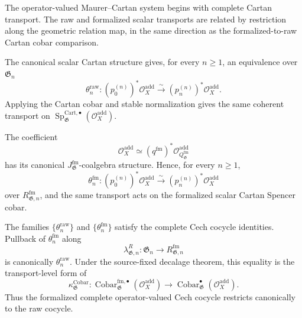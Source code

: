 The operator-valued Maurer--Cartan system begins with complete Cartan
transport.  The raw and formalized scalar transports are related by
restriction along the geometric relation map, in the same direction as the
formalized-to-raw Cartan cobar comparison.

\begin{construction}
\label{con:as-raw-operator-transport}
The canonical scalar Cartan structure gives, for every $n\geq1$, an
equivalence over $\mathfrak G_n$
\[
\boxed{
    \theta_n^{\mathrm{raw}}:
    (p_0^{(n)})^*\mathcal O_X^{\mathrm{add}}
    \xrightarrow{\sim}
    (p_n^{(n)})^*\mathcal O_X^{\mathrm{add}}.
}
\]
Applying the Cartan cobar and stable normalization gives the same coherent
transport on
$\operatorname{Sp}_{\mathfrak G}^{\mathrm{Cart},\bullet}
(\mathcal O_X^{\mathrm{add}})$.
\end{construction}

\begin{construction}
\label{con:as-formalized-operator-transport}
The coefficient
\[
    \mathcal O_X^{\mathrm{add}}
    \simeq
    (q^{\mathrm{fm}})^*
    \mathcal O_{Q_{\mathfrak G}^{\mathrm{fm}}}^{\mathrm{add}}
\]
has its canonical $J_{\mathfrak G}^{\mathrm{fm}}$-coalgebra structure.
Hence, for every $n\geq1$,
\[
\boxed{
    \theta_n^{\mathrm{fm}}:
    (p_0^{(n)})^*\mathcal O_X^{\mathrm{add}}
    \xrightarrow{\sim}
    (p_n^{(n)})^*\mathcal O_X^{\mathrm{add}}
}
\]
over $R_{\mathfrak G,n}^{\mathrm{fm}}$, and the same transport acts on the
formalized scalar Cartan Spencer cobar.
\end{construction}

\begin{theorem}
\label{thm:as-integral-mc}
The families
$\{\theta_n^{\mathrm{raw}}\}$ and $\{\theta_n^{\mathrm{fm}}\}$ satisfy the
complete Cech cocycle identities.  Pullback of
$\theta_n^{\mathrm{fm}}$ along
\[
    \lambda^R_{\mathfrak G,n}:
    \mathfrak G_n\longrightarrow R_{\mathfrak G,n}^{\mathrm{fm}}
\]
is canonically $\theta_n^{\mathrm{raw}}$.  Under the source-fixed decalage
theorem, this equality is the transport-level form of
\[
    \kappa_{\mathfrak G}^{\mathrm{Cobar}}:
    \operatorname{Cobar}_{\mathfrak G}^{\mathrm{fm},\bullet}
    (\mathcal O_X^{\mathrm{add}})
    \longrightarrow
    \operatorname{Cobar}_{\mathfrak G}^{\bullet}
    (\mathcal O_X^{\mathrm{add}}).
\]
Thus the formalized complete operator-valued Cech cocycle restricts
canonically to the raw cocycle.
\end{theorem}

